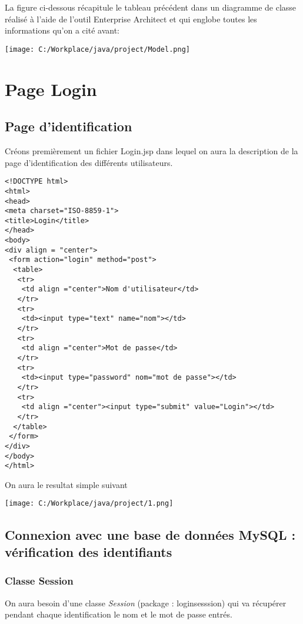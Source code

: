 \documentclass[12]{article}
\begin{document}
La figure ci-dessous récapitule le tableau précédent dans un diagramme de classe réalisé à l'aide de l'outil Enterprise Architect et qui englobe toutes les informations qu'on a cité avant:
\begin{center}
\texttt{[image: C:/Workplace/java/project/Model.png]}
\end{center}


\section{Page Login}
\subsection{Page d'identification}
\indent

Créons premièrement un fichier Login.jsp dans lequel on aura la description de la page d'identification des différents utilisateurs.

\lstset{language=XML}
\begin{small}
\begin{lstlisting}
<!DOCTYPE html>
<html>
<head>
<meta charset="ISO-8859-1">
<title>Login</title>
</head>
<body>
<div align = "center"> 
 <form action="login" method="post">
  <table>
   <tr>
    <td align ="center">Nom d'utilisateur</td>
   </tr>
   <tr>
    <td><input type="text" name="nom"></td>
   </tr>
   <tr>
    <td align ="center">Mot de passe</td>
   </tr>
   <tr>
    <td><input type="password" nom="mot de passe"></td>
   </tr>
   <tr>
    <td align ="center"><input type="submit" value="Login"></td>
   </tr>
  </table>
 </form>
</div>
</body>
</html>
\end{lstlisting}
\end{small}
\newpage
On aura le resultat simple suivant\\

\begin{center}
\texttt{[image: C:/Workplace/java/project/1.png]}
\end{center}




\subsection{Connexion avec une base de données MySQL : vérification des identifiants}


\subsubsection{Classe Session}
On aura besoin d'une classe \textit{Session} (package : loginsesssion) qui va récupérer pendant chaque identification le nom et le mot de passe entrés.\\
\end{document}
